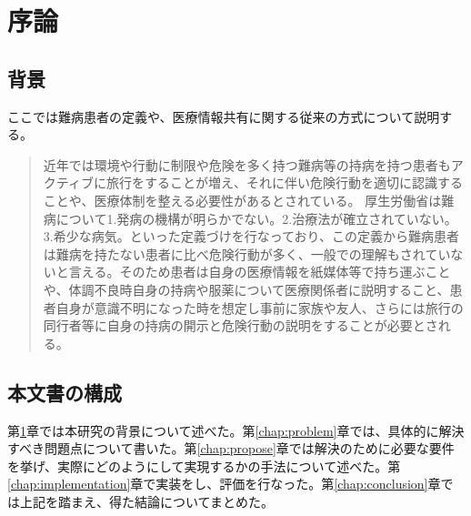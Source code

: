 \chapter{序論}
\label{chap:introduction}





\begin{comment}
論文は序論のようなもので始める。タイトルは序論でも序言でもはじめにでもいいけど、『序論』で始めたら『結論』で終わり、『序言』で始めたら『結言』で終わるようにする。『はじめに』なら『おわりに』で終わる。『序論』で始まって『おわりに』でおわるとか、そういうちぐはぐなのはだめ。

ここでは序論として書く。序論では、研究の背景やら目的やらを書くのが普通。今はテンプレートの説明なので、大して書くことは無い。
\end{comment}



\section{背景}

ここでは難病患者の定義や、医療情報共有に関する従来の方式について説明する。

\begin{quotation}

近年では環境や行動に制限や危険を多く持つ難病等の持病を持つ患者もアクティブに旅行をすることが増え、それに伴い危険行動を適切に認識することや、医療体制を整える必要性があるとされている。
厚生労働省は難病について1.発病の機構が明らかでない。2.治療法が確立されていない。3.希少な病気。といった定義づけを行なっており、この定義から難病患者は難病を持たない患者に比べ危険行動が多く、一般での理解もされていないと言える。そのため患者は自身の医療情報を紙媒体等で持ち運ぶことや、体調不良時自身の持病や服薬について医療関係者に説明すること、患者自身が意識不明になった時を想定し事前に家族や友人、さらには旅行の同行者等に自身の持病の開示と危険行動の説明をすることが必要とされる。

\end{quotation}



\begin{comment}
筆者はこの卒業論文用のテンプレートを大学院ガイドに例示されている体裁\cite{mag_guide12}に沿うように改造した。これは論文の形式で言えばもっと後ろに書いてあるべきことなのかもしれない。
\end{comment}


\section{本文書の構成}

第\ref{chap:introduction}章では本研究の背景について述べた。第\ref{chap:problem}章では、具体的に解決すべき問題点について書いた。第\ref{chap:propose}章では解決のために必要な要件を挙げ、実際にどのようにして実現するかの手法について述べた。第\ref{chap:implementation}章で実装をし、評価を行なった。第\ref{chap:conclusion}章では上記を踏まえ、得た結論についてまとめた。